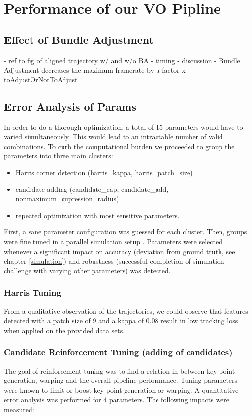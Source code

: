 \chapter{Performance of our VO Pipline}
\label{performance}

\section{Effect of Bundle Adjustment}
- ref to fig of aligned trajectory w/ and w/o BA
- timing 
- discussion
- Bundle Adjustment decreases the maximum framerate by a factor x
- toAdjustOrNotToAdjust

\section{Error Analysis of Params}

In order to do a thorough optimization, a total of 15 parameters would have to varied simultaneously. 
This would lead to an intractable number of valid combinations. To curb the computational burden we proceeded to group the parameters into three main clusters:

\begin{itemize}
    \item Harris corner detection (harris\_kappa, harris\_patch\_size)
    \item candidate adding (candidate\_cap, candidate\_add, nonmaximum\_supression\_radius)
    \item repeated optimization with most sensitive parameters.
\end{itemize}

First, a sane parameter configuration was guessed for each cluster. Then, groups were fine tuned in a parallel simulation setup . Parameters were selected whenever a significant impact on accuracy (deviation from ground truth, see chapter \ref{simulation}) and robustness (successful completion of simulation challenge with varying other parameters) was detected.

\subsection{Harris Tuning}
From a qualitative observation of the trajectories, we could observe that features detected with a patch size of 9 and a kappa of 0.08 result in low tracking loss when applied on the provided data sets.

\subsection{Candidate Reinforcement Tuning (adding of candidates)} 
The goal of reinforcement tuning was to find a relation in between key point generation, warping and the overall pipeline performance. Tuning parameters were known to limit or boost key point generation or warping. A quantitative error analysis was performed for 4 parameters. The following impacts were measured:

